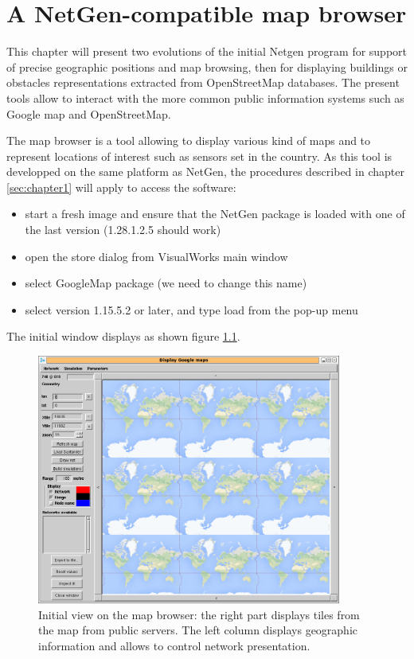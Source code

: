 
\chapter{A NetGen-compatible map browser}

This chapter will present two evolutions of the initial Netgen program for 
support of precise geographic positions and map browsing, then for displaying 
buildings or obstacles representations extracted from OpenStreetMap databases. 
The present tools allow to interact with the more common public information systems 
such as Google map and OpenStreetMap. 

The map browser is a tool allowing to display various kind of maps and to represent 
locations of interest such as sensors set in the country. 
As this tool is developped on the same platform as NetGen, the procedures described 
in chapter \ref{sec:chapter1} will apply to access the software: 
\begin{itemize}
\item start a fresh image and ensure that the NetGen package is loaded with one of the last 
version (1.28.1.2.5 should work)
\item open the store dialog from VisualWorks main window
\item select GoogleMap package (we need to change this name)
\item select version 1.15.5.2 or later, and type load from the pop-up menu
\end{itemize}

The initial window displays as shown figure \ref{fig:initialGmap}. 

\begin{figure}
\begin{center} 
\includegraphics[width=10cm]{gmap.png}
\caption{Initial view on the map browser: the right part displays tiles from the map 
from public servers. The left column displays geographic information and allows 
to control network presentation. }
\label{fig:initialGmap}
\end{center}
\end{figure}

